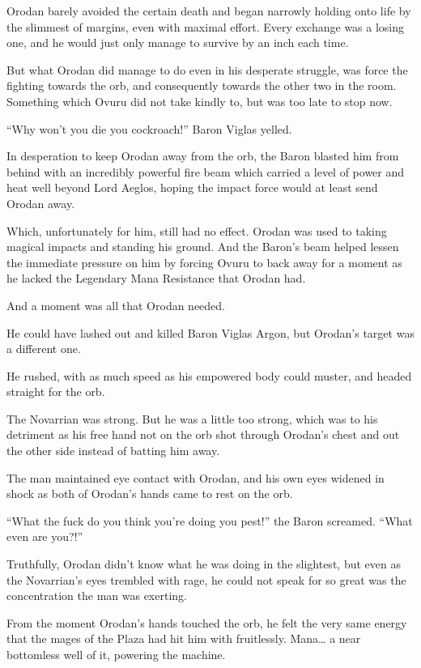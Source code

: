 \documentclass[a4paper,10pt]{book}
\begin{document}
Orodan barely avoided the certain death and began narrowly holding onto life by the slimmest of margins, even with maximal effort. Every exchange was a losing one, and he would just only manage to survive by an inch each time.\par
But what Orodan did manage to do even in his desperate struggle, was force the fighting towards the orb, and consequently towards the other two in the room. Something which Ovuru did not take kindly to, but was too late to stop now.\par
“Why won’t you die you cockroach!” Baron Viglas yelled.\par
In desperation to keep Orodan away from the orb, the Baron blasted him from behind with an incredibly powerful fire beam which carried a level of power and heat well beyond Lord Aeglos, hoping the impact force would at least send Orodan away.\par
Which, unfortunately for him, still had no effect. Orodan was used to taking magical impacts and standing his ground. And the Baron’s beam helped lessen the immediate pressure on him by forcing Ovuru to back away for a moment as he lacked the Legendary Mana Resistance that Orodan had.\par
And a moment was all that Orodan needed.\par
He could have lashed out and killed Baron Viglas Argon, but Orodan’s target was a different one.\par
He rushed, with as much speed as his empowered body could muster, and headed straight for the orb.\par
The Novarrian was strong. But he was a little too strong, which was to his detriment as his free hand not on the orb shot through Orodan’s chest and out the other side instead of batting him away.\par
The man maintained eye contact with Orodan, and his own eyes widened in shock as both of Orodan’s hands came to rest on the orb.\par
“What the fuck do you think you’re doing you pest!” the Baron screamed. “What even are you?!”\par
Truthfully, Orodan didn’t know what he was doing in the slightest, but even as the Novarrian’s eyes trembled with rage, he could not speak for so great was the concentration the man was exerting.\par
From the moment Orodan’s hands touched the orb, he felt the very same energy that the mages of the Plaza had hit him with fruitlessly. Mana… a near bottomless well of it, powering the machine.\par
\end{document}
